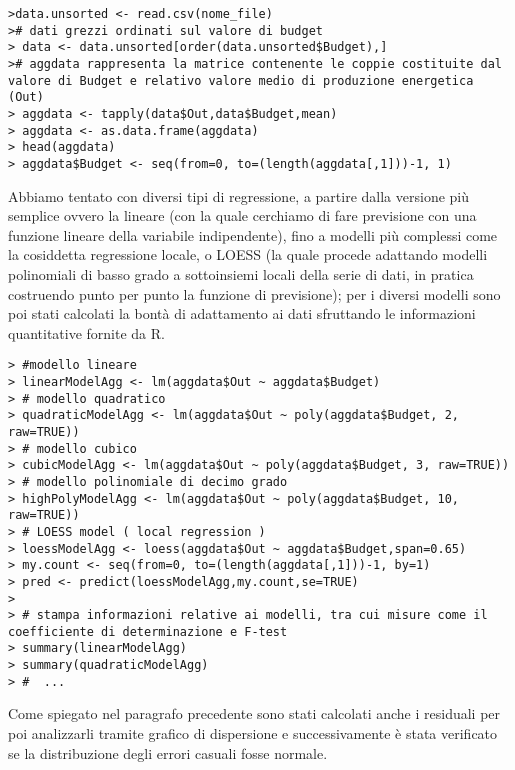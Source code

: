 \documentclass[12pt,a4paper,openright,twoside]{report}
\begin{document}
\begin{lstlisting}
>data.unsorted <- read.csv(nome_file)
># dati grezzi ordinati sul valore di budget
> data <- data.unsorted[order(data.unsorted$Budget),]
># aggdata rappresenta la matrice contenente le coppie costituite dal valore di Budget e relativo valore medio di produzione energetica (Out)
> aggdata <- tapply(data$Out,data$Budget,mean)
> aggdata <- as.data.frame(aggdata)  
> head(aggdata)
> aggdata$Budget <- seq(from=0, to=(length(aggdata[,1]))-1, 1)
\end{lstlisting}
 
Abbiamo tentato con diversi tipi di regressione, a partire dalla versione più semplice ovvero la lineare (con la quale cerchiamo di fare previsione con una funzione lineare della variabile indipendente), fino a modelli più complessi come la cosiddetta regressione locale, o LOESS \cite{lowess}(la quale procede adattando modelli polinomiali di basso grado a sottoinsiemi locali della serie di dati, in pratica costruendo punto per punto la funzione di previsione); per i diversi modelli sono poi stati calcolati la bontà di adattamento ai dati sfruttando le informazioni quantitative fornite da R.

\begin{lstlisting}
> #modello lineare
> linearModelAgg <- lm(aggdata$Out ~ aggdata$Budget)
> # modello quadratico
> quadraticModelAgg <- lm(aggdata$Out ~ poly(aggdata$Budget, 2, raw=TRUE))
> # modello cubico
> cubicModelAgg <- lm(aggdata$Out ~ poly(aggdata$Budget, 3, raw=TRUE))
> # modello polinomiale di decimo grado
> highPolyModelAgg <- lm(aggdata$Out ~ poly(aggdata$Budget, 10, raw=TRUE))
> # LOESS model ( local regression )
> loessModelAgg <- loess(aggdata$Out ~ aggdata$Budget,span=0.65)
> my.count <- seq(from=0, to=(length(aggdata[,1]))-1, by=1)
> pred <- predict(loessModelAgg,my.count,se=TRUE)
>
> # stampa informazioni relative ai modelli, tra cui misure come il coefficiente di determinazione e F-test
> summary(linearModelAgg)
> summary(quadraticModelAgg)
> #  ... 
\end{lstlisting}

Come spiegato nel paragrafo precedente sono stati calcolati anche i residuali per poi analizzarli tramite grafico di dispersione e successivamente è stata verificato se la distribuzione degli errori casuali fosse normale.
\end{document}

